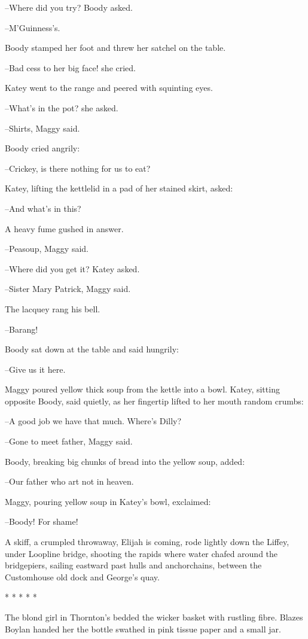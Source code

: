 --Where did you try? Boody asked.

--M'Guinness's.

Boody stamped her foot and threw her satchel on the table.

--Bad cess to her big face! she cried.

Katey went to the range
and peered with squinting eyes.

--What's in the pot? she asked.

--Shirts, Maggy said.

Boody cried angrily:

--Crickey, is there nothing for us to eat?

Katey, lifting the kettlelid in a pad of her stained skirt, asked:

--And what's in this?

A heavy fume gushed in answer.

--Peasoup, Maggy said.

--Where did you get it? Katey asked.

--Sister Mary Patrick,
Maggy said.

The lacquey rang his bell.

--Barang!

Boody sat down at the table and said hungrily:

--Give us it here.

Maggy poured yellow thick soup from the kettle into a bowl. Katey,
sitting opposite Boody, said quietly, as her fingertip lifted to her mouth
random crumbs:

--A good job we have that much. Where's Dilly?

--Gone to meet father, Maggy said.

Boody, breaking big chunks of bread into the yellow soup,
added:

--Our father who art not in heaven.

Maggy, pouring yellow soup in Katey's bowl, exclaimed:

--Boody! For shame!

A skiff, a crumpled throwaway, Elijah is coming, rode lightly down
the Liffey, under Loopline bridge, shooting the rapids where water chafed
around the bridgepiers, sailing eastward past hulls and anchorchains,
between the Customhouse old dock and George's quay.

    * * * * *


The blond girl in Thornton's bedded the wicker basket with rustling fibre.
Blazes Boylan handed her the bottle swathed in pink tissue paper
and a small jar.

